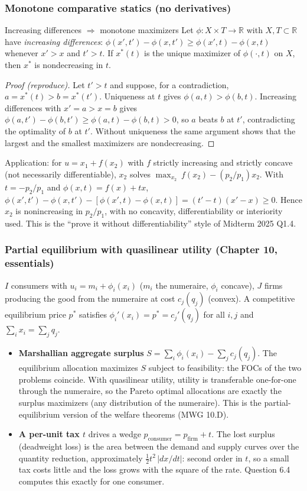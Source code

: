 \documentclass[11pt]{article}
\newcommand{\R}{\mathbb{R}}
\begin{document}
\subsubsection{Monotone comparative statics (no derivatives)}
\begin{prop}{Increasing differences $\Rightarrow$ monotone maximizers}
Let $\phi:X\times T\to\R$ with $X,T\subset\R$ have \emph{increasing differences}: $\phi(x',t')-\phi(x,t')\ge\phi(x',t)-\phi(x,t)$ whenever $x'>x$ and $t'>t$. If $x^*(t)$ is the unique maximizer of $\phi(\cdot,t)$ on $X$, then $x^*$ is nondecreasing in $t$.
\end{prop}
\begin{proof}[Proof (reproduce)]
Let $t'>t$ and suppose, for a contradiction, $a=x^*(t)>b=x^*(t')$. Uniqueness at $t$ gives $\phi(a,t)>\phi(b,t)$. Increasing differences with $x'=a>x=b$ gives $\phi(a,t')-\phi(b,t')\ge\phi(a,t)-\phi(b,t)>0$, so $a$ beats $b$ at $t'$, contradicting the optimality of $b$ at $t'$.
Without uniqueness the same argument shows that the largest and the smallest maximizers are nondecreasing.
\end{proof}
Application: for $u=x_1+f(x_2)$ with $f$ strictly increasing and strictly concave (not necessarily differentiable), $x_2$ solves $\max_{x_2}\ f(x_2)-(p_2/p_1)x_2$. With $t=-p_2/p_1$ and $\phi(x,t)=f(x)+tx$, $\phi(x',t')-\phi(x,t')-[\phi(x',t)-\phi(x,t)]=(t'-t)(x'-x)\ge0$. Hence $x_2$ is nonincreasing in $p_2/p_1$, with no concavity, differentiability or interiority used. This is the ``prove it without differentiability'' style of Midterm 2025 Q1.4.

\subsubsection{Partial equilibrium with quasilinear utility (Chapter 10, essentials)}
$I$ consumers with $u_i=m_i+\phi_i(x_i)$ ($m_i$ the numeraire, $\phi_i$ concave), $J$ firms producing the good from the numeraire at cost $c_j(q_j)$ (convex). A competitive equilibrium price $p^*$ satisfies $\phi_i'(x_i)=p^*=c_j'(q_j)$ for all $i,j$ and $\sum_ix_i=\sum_jq_j$.
\begin{itemize}
\item \textbf{Marshallian aggregate surplus} $S=\sum_i\phi_i(x_i)-\sum_jc_j(q_j)$. The equilibrium allocation maximizes $S$ subject to feasibility: the FOCs of the two problems coincide. With quasilinear utility, utility is transferable one-for-one through the numeraire, so the Pareto optimal allocations are exactly the surplus maximizers (any distribution of the numeraire). This is the partial-equilibrium version of the welfare theorems (MWG 10.D).
\item \textbf{A per-unit tax $t$} drives a wedge $p_{\text{consumer}}=p_{\text{firm}}+t$. The lost surplus (deadweight loss) is the area between the demand and supply curves over the quantity reduction, approximately $\tfrac12t^2\,|dx/dt|$: second order in $t$, so a small tax costs little and the loss grows with the square of the rate. Question 6.4 computes this exactly for one consumer.
\end{itemize}
\end{document}
